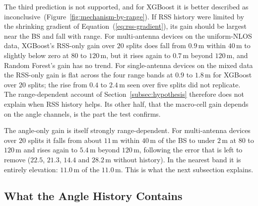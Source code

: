The third prediction is not supported, and for XGBoost it is better described as inconclusive~(Figure~\ref{fig:mechanism-by-range}). If RSS history were limited by the shrinking gradient of Equation~(\ref{eq:rss-gradient}), its gain should be largest near the BS and fall with range. For multi-antenna devices on the uniform-NLOS data, XGBoost's RSS-only gain over $20$ splits does fall from $0.9\,\text{m}$ within $40\,\text{m}$ to slightly below zero at $80$ to $120\,\text{m}$, but it rises again to $0.7\,\text{m}$ beyond $120\,\text{m}$, and Random Forest's gain has no trend. For single-antenna devices on the mixed data the RSS-only gain is flat across the four range bands at $0.9$ to $1.8\,\text{m}$ for XGBoost over $20$ splits; the rise from $0.4$ to $2.4\,\text{m}$ seen over five splits did not replicate. The range-dependent account of Section~\ref{subsec:hypothesis} therefore does not explain when RSS history helps. Its other half, that the macro-cell gain depends on the angle channels, is the part the test confirms.

The angle-only gain is itself strongly range-dependent. For multi-antenna devices over $20$ splits it falls from about $11\,\text{m}$ within $40\,\text{m}$ of the BS to under $2\,\text{m}$ at $80$ to $120\,\text{m}$ and rises again to $5.4\,\text{m}$ beyond $120\,\text{m}$, following the error that is left to remove ($22.5$, $21.3$, $14.4$ and $28.2\,\text{m}$ without history). In the nearest band it is entirely elevation: $11.0\,\text{m}$ of the $11.0\,\text{m}$. This is what the next subsection explains.

\subsection{What the Angle History Contains}
\label{subsec:averaging}

